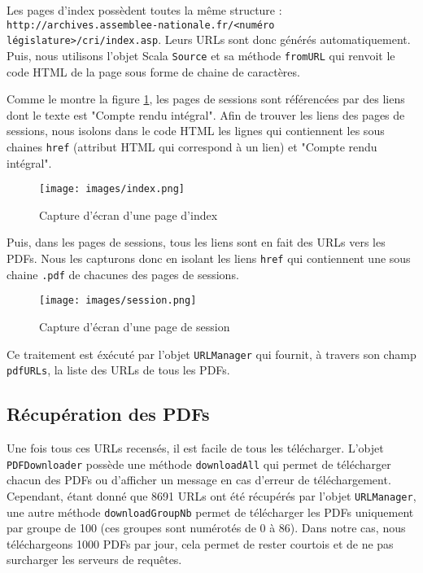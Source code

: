 Les pages d'index possèdent toutes la même structure : \verb|http://archives.assemblee-nationale.fr/<numéro législature>/cri/index.asp|. Leurs URLs sont donc générés automatiquement. Puis, nous utilisons l'objet Scala \verb|Source| et sa méthode \verb|fromURL| qui renvoit le code HTML de la page sous forme de chaine de caractères.

Comme le montre la figure \ref{figure_index}, les pages de sessions sont référencées par des liens dont le texte est "Compte rendu intégral". Afin de trouver les liens des pages de sessions, nous isolons dans le code HTML les lignes qui contiennent les sous chaines \verb|href| (attribut HTML qui correspond à un lien) et "Compte rendu intégral".

\vspace{0.2cm}
\begin{figure}[!h]
\texttt{[image: images/index.png]}
\caption{Capture d'écran d'une page d'index}
\label{figure_index}
\end{figure}
\vspace{0.2cm}

Puis, dans les pages de sessions, tous les liens sont en fait des URLs vers les PDFs. Nous les capturons donc en isolant les liens \verb|href| qui contiennent une sous chaine \verb|.pdf| de chacunes des pages de sessions.

\vspace{0.2cm}
\begin{figure}[!h]
\texttt{[image: images/session.png]}
\caption{Capture d'écran d'une page de session}
\end{figure}
\vspace{0.2cm}

Ce traitement est éxécuté par l'objet \verb|URLManager| qui fournit, à travers son champ \verb|pdfURLs|, la liste des URLs de tous les PDFs.

\subsection{Récupération des PDFs}

Une fois tous ces URLs recensés, il est facile de tous les télécharger. L'objet \verb|PDFDownloader| possède une méthode \verb|downloadAll| qui permet de télécharger chacun des PDFs ou d'afficher un message en cas d'erreur de téléchargement. Cependant, étant donné que 8691 URLs ont été récupérés par l'objet \verb|URLManager|, une autre méthode \verb|downloadGroupNb| permet de télécharger les PDFs uniquement par groupe de 100 (ces groupes sont numérotés de 0 à 86). Dans notre cas, nous téléchargeons 1000 PDFs par jour, cela permet de rester courtois et de ne pas surcharger les serveurs de requêtes.

